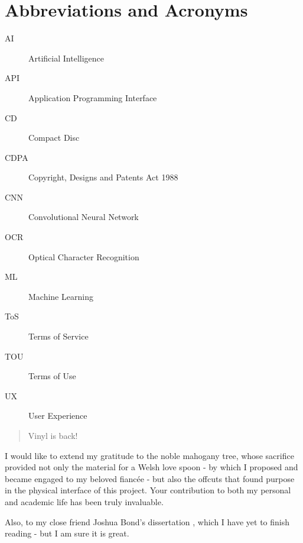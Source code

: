     
    \uomtoc
    \uomlof
    \uomlot
    
    \section*{Abbreviations and Acronyms}
    
      \begin{description}
        \item[AI] Artificial Intelligence
        \item[API] Application Programming Interface
        \item[CD] Compact Disc
        \item[CDPA] Copyright, Designs and Patents Act 1988
        \item[CNN] Convolutional Neural Network
        \item[OCR] Optical Character Recognition
        \item[ML] Machine Learning
        \item[ToS] Terms of Service
        \item[TOU] Terms of Use
        \item[UX] User Experience
      \end{description}
    
    \begin{abstract} %
      Vinyl is back!
    
    \end{abstract}%
    \clearpage
    
    
    
    \uomdeclarations %
    
    
    
    \begin{uomacknowledgements}
    I would like to extend my gratitude to the noble mahogany tree, whose sacrifice provided not only the material for a Welsh love spoon - by which I proposed and became engaged to my beloved fiancée - but also the offcuts that found purpose in the physical interface of this project. Your contribution to both my personal and academic life has been truly invaluable.
    
    Also, to my close friend Joshua Bond’s dissertation \cite{jdbond}, which I have yet to finish reading - but I am sure it is great.
    \end{uomacknowledgements}
    
